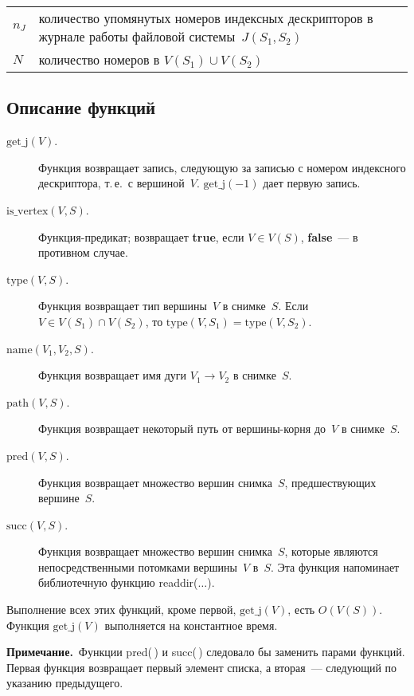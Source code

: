 \begin{multicols}{2}
\noindent
{\tabcolsep=3pt
\begin{tabular}{lp{72.5mm}}
$n_J$ & количество упомянутых номеров индексных дескрипторов в журнале 
работы файловой сис\-те\-мы~$J(S_1, S_2)$\\
$N$ & количество номеров в $V(S_1)\cup V(S_2)$
\end{tabular}
}

\subsection{Описание функций}

\noindent
\begin{description}
\item[$\mathrm{get}\_\mathrm{j}(V)$.] Функция возвращает запись, 
сле\-ду\-ющую за записью с номером индексного дескриптора, т.\,е.\ с 
вершиной~$V$. $\mathrm{get}\_\mathrm{j}(-1)$ дает первую запись.
\item[$\mathrm{is}\_\mathrm{vertex}(V, S)$.] Функция-предикат; возвращает 
\textbf{true}, если $V\in V(S)$, \textbf{false}~--- в противном случае.
\item[$\mathrm{type}(V, S)$.] Функция возвращает тип вершины~$V$ в 
снимке~$S$. Если $V\in  V(S_1) \cap V(S_2)$, то $\mathrm{type}(V, S_1) = 
\mathrm{type}(V, S_2)$.
\item[$\mathrm{name}(V_1, V_2, S)$.] Функция возвращает имя дуги 
$V_1\rightarrow V_2$ в снимке~$S$.
\item[$\mathrm{path}(V, S)$.] Функция возвращает некоторый путь от 
вершины-корня до~$V$ в снимке~$S$.
\item[$\mathrm{pred}(V, S)$.] Функция возвращает множество вершин 
снимка~$S$, предшествующих вершине~$S$.
\item[$\mathrm{succ}(V, S)$.] Функция возвращает множество вершин 
снимка~$S$, которые являются непосредственными потомками вершины~$V$ 
в~$S$. Эта функция напоминает библиотечную функцию readdir($\ldots$).
\end{description}
      
      Выполнение всех этих функций, кроме первой, 
$\mathrm{get}\_\mathrm{j}(V)$, есть $O(V(S))$. Функция 
$\mathrm{get}\_\mathrm{j}(V)$ выполняется на константное время.
      
      \smallskip

      \noindent
{\sf \textbf{Примечание.}\
 Функции pred(\,) и succ(\,) следовало бы заменить 
парами функций. Первая функция возвращает первый элемент списка, а 
вторая~--- следующий по указанию предыдущего.}
      

\end{multicols}
